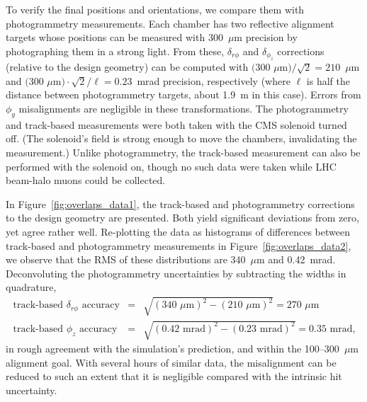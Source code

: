 To verify the final positions and orientations, we compare them with
photogrammetry measurements.  Each chamber has two reflective
alignment targets whose positions can be measured with 300~$\mu$m
precision by photographing them in a strong light.  From these,
$\delta_{r\phi}$ and $\delta_{\phi_z}$ corrections (relative to the
design geometry) can be computed with $\mbox{(300~$\mu$m)}/\sqrt{2} =
210$~$\mu$m and $\mbox{(300~$\mu$m)} \cdot \sqrt{2} / \ell =
0.23$~mrad precision, respectively (where $\ell$ is half the distance
between photogrammetry targets, about 1.9~m in this case).  Errors
from $\phi_y$ misalignments are negligible in these transformations.
The photogrammetry and track-based measurements were both taken with
the CMS solenoid turned off.  (The solenoid's field is strong enough
to move the chambers, invalidating the measurement.)  Unlike
photogrammetry, the track-based measurement can also be performed with
the solenoid on, though no such data were taken while LHC beam-halo
muons could be collected.

In Figure~\ref{fig:overlaps_data1}, the track-based and photogrammetry
corrections to the design geometry are presented.  Both yield
significant deviations from zero, yet agree rather well.  Re-plotting
the data as histograms of differences between track-based and
photogrammetry measurements in Figure~\ref{fig:overlaps_data2}, we
observe that the RMS of these distributions are 340~$\mu$m and
0.42~mrad.  Deconvoluting the photogrammetry uncertainties by
subtracting the widths in quadrature,
\begin{eqnarray}
\mbox{track-based $\delta_{r\phi}$ accuracy} &=& \sqrt{(\mbox{340~$\mu$m})^2 - (\mbox{210~$\mu$m})^2} = \mbox{270~$\mu$m} \\
\mbox{track-based $\phi_z$ accuracy} &=& \sqrt{(\mbox{0.42~mrad})^2 - (\mbox{0.23~mrad})^2} = \mbox{0.35~mrad,}
\end{eqnarray}
in rough agreement with the simulation's prediction, and within the
100--300~$\mu$m alignment goal.  With several hours of similar data,
the misalignment can be reduced to such an extent that it is
negligible compared with the intrinsic hit uncertainty.

